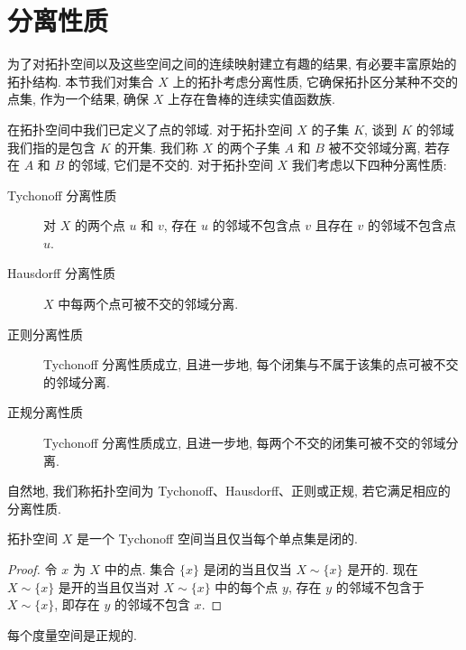 \documentclass[../../main.tex]{subfiles}
\begin{document}
\section{分离性质}\label{section:ch11-分离性质}

为了对拓扑空间以及这些空间之间的连续映射建立有趣的结果, 有必要丰富原始的拓扑结构. 本节我们对集合 $X$ 上的拓扑考虑分离性质, 它确保拓扑区分某种不交的点集, 作为一个结果, 确保 $X$ 上存在鲁棒的连续实值函数族.

在拓扑空间中我们已定义了点的邻域. 对于拓扑空间 $X$ 的子集 $K$, 谈到 $K$ 的邻域我们指的是包含 $K$ 的开集. 我们称 $X$ 的两个子集 $A$ 和 $B$ 被不交邻域分离, 若存在 $A$ 和 $B$ 的邻域, 它们是不交的. 对于拓扑空间 $X$ 我们考虑以下四种分离性质:

\begin{definition}\label{definition:ch11-分离性质}
\begin{description}
\item[Tychonoff 分离性质] 对 $X$ 的两个点 $u$ 和 $v$, 存在 $u$ 的邻域不包含点 $v$ 且存在 $v$ 的邻域不包含点 $u$.
\item[Hausdorff 分离性质] $X$ 中每两个点可被不交的邻域分离.
\item[正则分离性质] Tychonoff 分离性质成立, 且进一步地, 每个闭集与不属于该集的点可被不交的邻域分离.
\item[正规分离性质] Tychonoff 分离性质成立, 且进一步地, 每两个不交的闭集可被不交的邻域分离.
\end{description}
\end{definition}

自然地, 我们称拓扑空间为 Tychonoff、Hausdorff、正则或正规, 若它满足相应的分离性质.

\begin{proposition}\label{proposition:ch11-Tychonoff等价}
拓扑空间 $X$ 是一个 Tychonoff 空间当且仅当每个单点集是闭的.
\end{proposition}

\begin{proof}
令 $x$ 为 $X$ 中的点. 集合 $\{x\}$ 是闭的当且仅当 $X\sim\{x\}$ 是开的. 现在 $X\sim\{x\}$ 是开的当且仅当对 $X\sim\{x\}$ 中的每个点 $y$, 存在 $y$ 的邻域不包含于 $X\sim\{x\}$, 即存在 $y$ 的邻域不包含 $x$.
\end{proof}

\begin{proposition}\label{proposition:ch11-度量空间正规}
每个度量空间是正规的.
\end{proposition}
\end{document}

